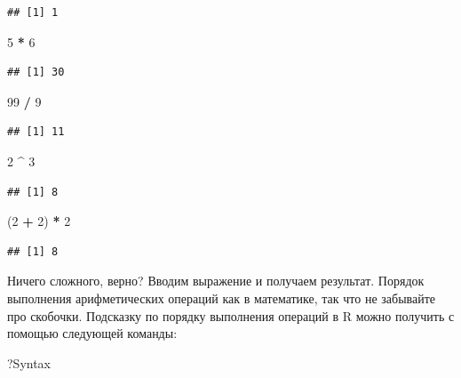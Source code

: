 \documentclass[
]{book}
\newenvironment{Shaded}{\begin{snugshade}}{\end{snugshade}}
\newcommand{\DecValTok}[1]{\textcolor[rgb]{0.00,0.00,0.81}{#1}}
\newcommand{\NormalTok}[1]{#1}
\newcommand{\OperatorTok}[1]{\textcolor[rgb]{0.81,0.36,0.00}{\textbf{#1}}}
\newcommand{\StringTok}[1]{\textcolor[rgb]{0.31,0.60,0.02}{#1}}
\begin{document}
\begin{verbatim}
## [1] 1
\end{verbatim}

\begin{Shaded}
\begin{Highlighting}[]
\DecValTok{5} \OperatorTok{*}\StringTok{ }\DecValTok{6}
\end{Highlighting}
\end{Shaded}

\begin{verbatim}
## [1] 30
\end{verbatim}

\begin{Shaded}
\begin{Highlighting}[]
\DecValTok{99} \OperatorTok{/}\StringTok{ }\DecValTok{9}
\end{Highlighting}
\end{Shaded}

\begin{verbatim}
## [1] 11
\end{verbatim}

\begin{Shaded}
\begin{Highlighting}[]
\DecValTok{2} \OperatorTok{^}\StringTok{ }\DecValTok{3}
\end{Highlighting}
\end{Shaded}

\begin{verbatim}
## [1] 8
\end{verbatim}

\begin{Shaded}
\begin{Highlighting}[]
\NormalTok{(}\DecValTok{2} \OperatorTok{+}\StringTok{ }\DecValTok{2}\NormalTok{) }\OperatorTok{*}\StringTok{ }\DecValTok{2}
\end{Highlighting}
\end{Shaded}

\begin{verbatim}
## [1] 8
\end{verbatim}

Ничего сложного, верно? Вводим выражение и получаем результат. Порядок выполнения арифметических операций как в математике, так что не забывайте про скобочки. Подсказку по порядку выполнения операций в R можно получить с помощью следующей команды:

\begin{Shaded}
\begin{Highlighting}[]
\NormalTok{?Syntax}
\end{Highlighting}
\end{Shaded}
\end{document}
